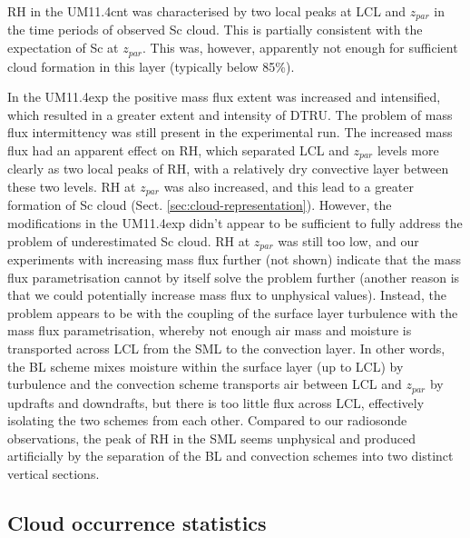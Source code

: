RH in the UM11.4cnt was characterised by two local peaks at LCL and $z_{par}$
in the time periods of observed Sc cloud. This is partially consistent
with the expectation of Sc at $z_{par}$. This was, however, apparently not
enough for sufficient cloud formation in this layer (typically below 85\%).

In the UM11.4exp the positive mass flux extent was increased and intensified,
which resulted in a greater extent and intensity of DTRU. The problem of
mass flux intermittency was still present in the experimental run. The increased
mass flux had an apparent effect on RH, which separated LCL and $z_{par}$
levels more clearly as two local peaks of RH, with a relatively dry
convective layer between these two levels. RH at $z_{par}$ was also increased,
and this lead to a greater formation of Sc cloud (Sect.
\ref{sec:cloud-representation}). However, the modifications in the UM11.4exp
didn't appear to be sufficient to fully address the problem of underestimated
Sc cloud. RH at $z_{par}$ was still too low, and our experiments with
increasing mass flux further (not shown) indicate that the mass flux
parametrisation cannot by itself solve the problem further (another
reason is that we could potentially increase mass flux to unphysical values).
Instead, the problem appears to be with the coupling of the surface layer
turbulence with the mass flux parametrisation, whereby not enough air mass
and moisture is transported across LCL from the SML to the convection layer. In
other words, the BL scheme mixes moisture within the surface layer (up to LCL)
by turbulence and the convection scheme transports air between LCL and
$z_{par}$ by updrafts and downdrafts, but there is too little flux across LCL,
effectively isolating the two schemes from each other. Compared to our
radiosonde observations, the peak of RH in the SML seems unphysical and
produced artificially by the separation of the BL and convection schemes
into two distinct vertical sections.

\subsection{Cloud occurrence statistics}
\label{sec:cloud-occurrence-statistics}


